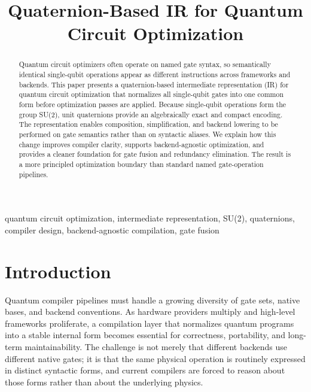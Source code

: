 \documentclass[conference]{IEEEtran}
\begin{document}
\title{Quaternion-Based IR for Quantum Circuit Optimization}

\author{
}

\maketitle

\begin{abstract}
Quantum circuit optimizers often operate on named gate syntax, so semantically
identical single-qubit operations appear as different instructions across frameworks
and backends. This paper presents a quaternion-based intermediate representation (IR)
for quantum circuit optimization that normalizes all single-qubit gates into one common
form before optimization passes are applied. Because single-qubit operations form the
group SU(2), unit quaternions provide an algebraically exact and compact encoding. The
representation enables composition, simplification, and backend lowering to be performed
on gate semantics rather than on syntactic aliases. We explain how this change improves
compiler clarity, supports backend-agnostic optimization, and provides a cleaner
foundation for gate fusion and redundancy elimination. The result is a more principled
optimization boundary than standard named gate-operation pipelines.
\end{abstract}

\begin{IEEEkeywords}
quantum circuit optimization, intermediate representation, SU(2), quaternions,
compiler design, backend-agnostic compilation, gate fusion
\end{IEEEkeywords}

\section{Introduction}

Quantum compiler pipelines must handle a growing diversity of gate sets, native bases,
and backend conventions. As hardware providers multiply and high-level frameworks
proliferate, a compilation layer that normalizes quantum programs into a stable internal
form becomes essential for correctness, portability, and long-term maintainability. The
challenge is not merely that different backends use different native gates; it is that
the same physical operation is routinely expressed in distinct syntactic forms, and
current compilers are forced to reason about those forms rather than about the underlying
physics.
\end{document}
